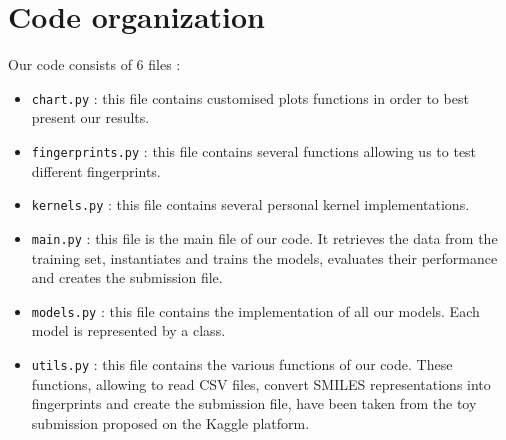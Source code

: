 \newpage
\appendix
\section{Code organization}
Our code consists of 6 files :
\begin{itemize}
    \item \texttt{chart.py} : this file contains customised plots functions in order to best present our results.
    \item \texttt{fingerprints.py} : this file contains several functions allowing us to test different fingerprints.
    \item \texttt{kernels.py} : this file contains several personal kernel implementations.
    \item \texttt{main.py} : this file is the main file of our code. It retrieves the data from the training set, instantiates and trains the models, evaluates their performance and creates the submission file.
    \item \texttt{models.py} : this file contains the implementation of all our models. Each model is represented by a class.
    \item \texttt{utils.py} : this file contains the various functions of our code. These functions, allowing to read CSV files, convert SMILES representations into fingerprints and create the submission file, have been taken from the toy submission proposed on the Kaggle platform.
\end{itemize}
